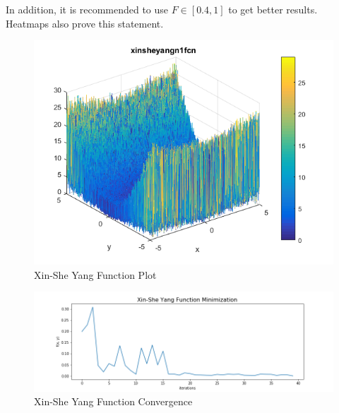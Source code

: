 \documentclass[A4, twocolumn]{article}
\begin{document}
	 In addition, it is recommended to use $F \in [0.4, 1]$ to get better results. Heatmaps also prove this statement.
	
	 \begin{figure}
	 	\includegraphics[width=\linewidth]{xin_she_yang/xin_she_yang_plot.png}
	 	\caption{Xin-She Yang Function Plot}
	 	\label{fig:Xin-She Yang Function Plot}
	 \end{figure}
	 
	 
	 \begin{figure}
	 	\includegraphics[width=\linewidth]{xin_she_yang/xin_she_yang_convergence.png}
	 	\caption{Xin-She Yang Function Convergence}
	 	\label{fig:Xin-She Yang Function Convergence}
	 \end{figure}
	 
\end{document}
